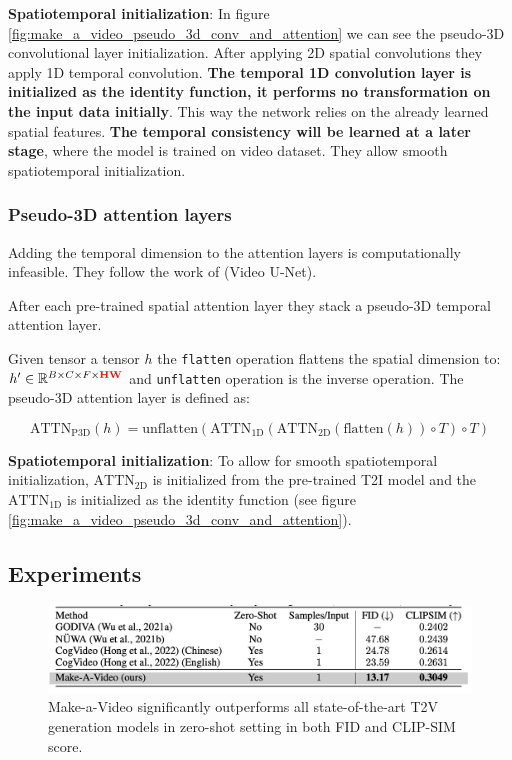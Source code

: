 \textbf{Spatiotemporal initialization}: In figure \ref{fig:make_a_video_pseudo_3d_conv_and_attention} we can see the pseudo-3D convolutional layer initialization. After applying 2D spatial convolutions they apply 1D temporal convolution. \textbf{The temporal 1D convolution layer is initialized as the identity function, it performs no transformation on the input data initially}. This way the network relies on the already learned spatial features. \textbf{The temporal consistency will be learned at a later stage}, where the model is trained on video dataset. They allow smooth spatiotemporal initialization.






\subsubsection{Pseudo-3D attention layers}

Adding the temporal dimension to the attention layers is computationally infeasible. They follow the work of \cite{video_diffusion_models} (Video U-Net).

After each pre-trained spatial attention layer they stack a pseudo-3D temporal attention layer. 

Given tensor a tensor $h$ the \texttt{flatten} operation flattens the spatial dimension to: $h' \in \mathbb{R}^{B\times C\times F\times \mathbf{\textcolor{red}{HW}}}$ and \texttt{unflatten} operation is the inverse operation. The pseudo-3D attention layer is defined as:

\[ \text{ATTN}_{\text{P3D}} (h) = \text{unflatten} 
(\text{ATTN}_{\text{1D}} 
(\text{ATTN}_{\text{2D}} 
(\text{flatten} (h)) \circ T) \circ T) 
\]

\textbf{Spatiotemporal initialization}: To allow for smooth spatiotemporal initialization, $\text{ATTN}_{\text{2D}}$ is initialized from the pre-trained T2I model and the $\text{ATTN}_{\text{1D}}$ is initialized as the identity function (see figure \ref{fig:make_a_video_pseudo_3d_conv_and_attention}).













\subsection{Experiments}

\begin{figure}
    \centering
    \includegraphics[width=1\textwidth]{images/make_a_video/zero_shot_eval.png}
    \caption{Make-a-Video significantly outperforms all state-of-the-art T2V generation models in zero-shot setting in both FID and CLIP-SIM score.}
    \label{fig:make_a_video_zeroshot_eval}
\end{figure}